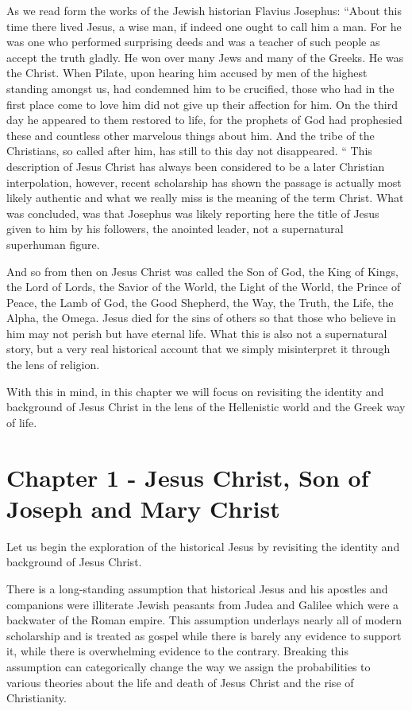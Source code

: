 As we read form the works of the Jewish historian Flavius Josephus:
``About this time there lived Jesus, a wise man, if indeed one ought to call him a man.
For he was one who performed surprising deeds and was a teacher of such people as accept the truth gladly.
He won over many Jews and many of the Greeks.
He was the Christ.
When Pilate, upon hearing him accused by men of the highest standing amongst us, had condemned him to be crucified, those who had in the first place come to love him did not give up their affection for him.
On the third day he appeared to them restored to life, for the prophets of God had prophesied these and countless other marvelous things about him.
And the tribe of the Christians, so called after him, has still to this day not disappeared.
``
This description of Jesus Christ has always been considered to be a later Christian interpolation, however, recent scholarship has shown the passage is actually most likely authentic and what we really miss is the meaning of the term Christ.
What was concluded, was that Josephus was likely reporting here the title of Jesus given to him by his followers, the anointed leader, not a supernatural superhuman figure.

And so from then on Jesus Christ was called the Son of God, the King of Kings, the Lord of Lords, the Savior of the World, the Light of the World, the Prince of Peace, the Lamb of God, the Good Shepherd, the Way, the Truth, the Life, the Alpha, the Omega.
Jesus died for the sins of others so that those who believe in him may not perish but have eternal life.
What this is also not a supernatural story, but a very real historical account that we simply misinterpret it through the lens of religion.

With this in mind, in this chapter we will focus on revisiting the identity and background of Jesus Christ in the lens of the Hellenistic world and the Greek way of life.

\section{Chapter 1 - Jesus Christ, Son of Joseph and Mary Christ}\label{sec:chapter-1---jesus-christ-son-of-joseph-and-mary-christ}

Let us begin the exploration of the historical Jesus by revisiting the identity and background of Jesus Christ.

There is a long-standing assumption that historical Jesus and his apostles and companions were illiterate Jewish peasants from Judea and Galilee which were a backwater of the Roman empire.
This assumption underlays nearly all of modern scholarship and is treated as gospel while there is barely any evidence to support it, while there is overwhelming evidence to the contrary.
Breaking this assumption can categorically change the way we assign the probabilities to various theories about the life and death of Jesus Christ and the rise of Christianity.

